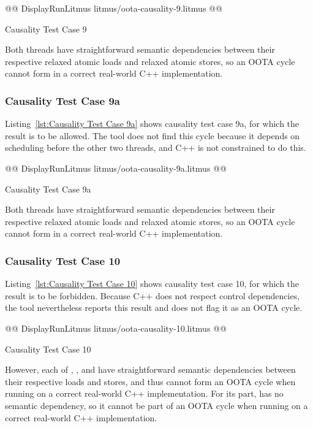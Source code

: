 \documentclass[10]{article}
\begin{document}
\begin{listing}[tbp]
@@ DisplayRunLitmus litmus/oota-causality-9.litmus @@
\caption{Causality Test Case 9}
\label{lst:Causality Test Case 9}
\end{listing}

Both threads have straightforward semantic dependencies between their
respective relaxed atomic loads and relaxed atomic stores, so an OOTA
cycle cannot form in a correct real-world C++ implementation.

\subsubsection{Causality Test Case 9a}
\label{app:Causality Test Case 9a}

Listing~\ref{lst:Causality Test Case 9a}
shows causality test case 9a, for which the 
result is to be allowed.
The  tool does not find this cycle because it depends on
scheduling  before the other two threads, and C++ is not
constrained to do this.

\begin{listing}[tbp]
@@ DisplayRunLitmus litmus/oota-causality-9a.litmus @@
\caption{Causality Test Case 9a}
\label{lst:Causality Test Case 9a}
\end{listing}

Both threads have straightforward semantic dependencies between their
respective relaxed atomic loads and relaxed atomic stores, so an OOTA
cycle cannot form in a correct real-world C++ implementation.

\subsubsection{Causality Test Case 10}
\label{app:Causality Test Case 10}

Listing~\ref{lst:Causality Test Case 10}
shows causality test case 10, for which the 
result is to be forbidden.
Because C++ does not respect control dependencies, the  tool
nevertheless reports this result and does not flag it as an OOTA cycle.

\begin{listing}[tbp]
@@ DisplayRunLitmus litmus/oota-causality-10.litmus @@
\caption{Causality Test Case 10}
\label{lst:Causality Test Case 10}
\end{listing}

However, each of , , and  have straightforward
semantic dependencies between their respective loads and stores, and
thus cannot form an OOTA cycle when running on a correct real-world C++
implementation.
For its part,  has no semantic dependency, so it cannot be part
of an OOTA cycle when running on a correct real-world C++ implementation.
\end{document}

